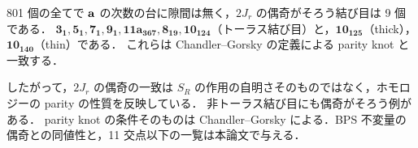 \begin{compresult}
801 個の全てで $\mathbf{a}$ の次数の台に隙間は無く，$2J_r$ の偶奇がそろう結び目は 9 個である．
$\mathbf{3_1},\mathbf{5_1},\mathbf{7_1},\mathbf{9_1},\mathbf{11a_{367}},\mathbf{8_{19}},\mathbf{10_{124}}$（トーラス結び目）と，$\mathbf{10_{125}}$（thick），$\mathbf{10_{140}}$（thin）である．
これらは Chandler--Gorsky の定義による parity knot と一致する．
\end{compresult}

したがって，$2J_r$ の偶奇の一致は $S_R$ の作用の自明さそのものではなく，ホモロジーの parity の性質を反映している．
非トーラス結び目にも偶奇がそろう例がある．
parity knot の条件そのものは Chandler--Gorsky による．BPS 不変量の偶奇との同値性と，11 交点以下の一覧は本論文で与える．

